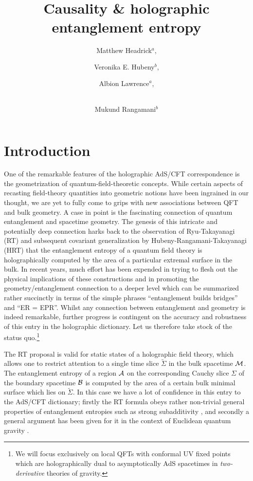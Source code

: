 \documentclass[12pt]{article}
\title{Causality \& holographic entanglement entropy}
\author{Matthew Headrick$^a$,}
\author{Veronika E. Hubeny$^b$,}
\author{Albion Lawrence$^a$,}
\author{ \\  Mukund Rangamani$^b$}
\affiliation[a]{ Martin Fisher School of Physics, Brandeis University, \\
MS 057, 415 South Street, Waltham, MA 02454, USA.}
\affiliation[b]{
Centre for Particle Theory \& Department of Mathematical Sciences,\\
Science Laboratories, South Road, Durham DH1 3LE, UK.}
\def\bulk{{\cal M}}
\def\bdy{{\cal B}}
\def\regA{{\cal A}}
\begin{document}
\maketitle

\section{Introduction} \label{sec:intro}


One of the remarkable features of the holographic AdS/CFT correspondence is the geometrization of quantum-field-theoretic concepts. While certain aspects of recasting field-theory quantities into geometric notions have been ingrained in our thought, we are yet to fully come to grips with new associations between QFT and bulk geometry. A case in point is the fascinating connection of quantum entanglement and  spacetime geometry. 
The genesis of this intricate and potentially deep connection harks back to the observation of Ryu-Takayanagi (RT) \cite{Ryu:2006ef,Ryu:2006bv} and subsequent covariant generalization by Hubeny-Rangamani-Takayanagi (HRT) 
\cite{Hubeny:2007xt}  that the entanglement entropy of a quantum field theory is holographically computed by the area of a particular extremal surface in the bulk. In recent years, much effort has been expended in trying to flesh out the physical implications of these constructions and in promoting the geometry/entanglement connection to a deeper level \cite{Swingle:2009bg, VanRaamsdonk:2009ar,VanRaamsdonk:2010pw, Maldacena:2013xja} which can be summarized rather succinctly in terms of the simple phrases ``entanglement builds bridges'' and ``ER = EPR''.
Whilst any connection between entanglement and geometry is indeed remarkable, further progress is contingent on the accuracy and robustness of this entry in the holographic dictionary. Let us therefore take stock of the status quo.\footnote{ We will focus exclusively on local QFTs with conformal UV fixed points  which are holographically dual to asymptotically AdS spacetimes in 
{\em two-derivative} theories of gravity.}

The RT proposal is valid for static states of a holographic field theory, which allows one to restrict attention to a single time slice ${\tilde \Sigma}$ in the bulk spacetime $\bulk$. 
The entanglement entropy of a region $\regA$ on the corresponding
Cauchy slice $\Sigma$ of the boundary spacetime $\bdy$ is computed by the area of a certain bulk minimal surface which lies on ${\tilde \Sigma}$.
In this case we have a lot of confidence in this entry to the AdS/CFT dictionary; firstly the RT formula obeys rather non-trivial general properties of entanglement entropies such as strong subadditivity \cite{Headrick:2007km,Hayden:2011ag,Headrick:2013zda}, and secondly a general argument has been given for it in the context of Euclidean quantum gravity \cite{Lewkowycz:2013nqa}.
\end{document}
